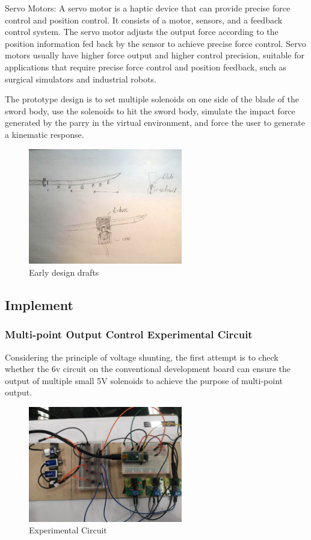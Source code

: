 Servo Motors: A servo motor is a haptic device that can provide precise force control and position control. It consists of a motor, sensors, and a feedback control system. The servo motor adjusts the output force according to the position information fed back by the sensor to achieve precise force control. Servo motors usually have higher force output and higher control precision, suitable for applications that require precise force control and position feedback, such as surgical simulators and industrial robots.

The prototype design is to set multiple solenoids on one side of the blade of the sword body, use the solenoids to hit the sword body, simulate the impact force generated by the parry in the virtual environment, and force the user to generate a kinematic response.

\begin{figure}[h]
\centering
\includegraphics[width=0.6\textwidth]{A_thesis/figures/019.png}
\caption{Early design drafts}
\end{figure}

\subsection{Implement}
\subsubsection{Multi-point Output Control Experimental Circuit}
Considering the principle of voltage shunting, the first attempt is to check whether the 6v circuit on the conventional development board can ensure the output of multiple small 5V solenoids to achieve the purpose of multi-point output.

\begin{figure}[h]
\centering
\includegraphics[width=0.6\textwidth]{A_thesis/figures/020.png}
\caption{Experimental Circuit}
\end{figure}

